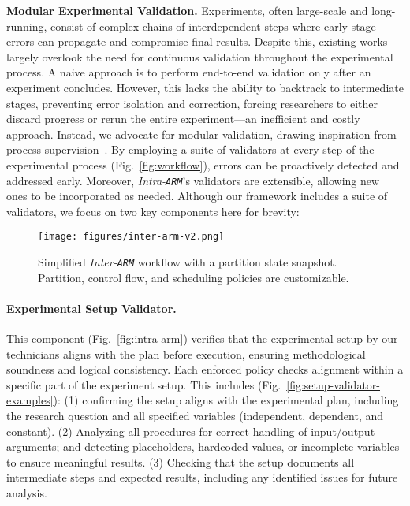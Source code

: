 \noindent\textbf{Modular Experimental Validation.} 
Experiments, often large-scale and long-running, consist of complex chains of interdependent steps where early-stage errors can propagate and compromise final results. Despite this, existing works~\cite{lu2024ai, schmidgall2025agent} largely overlook the need for continuous validation throughout the experimental process.
A naive approach is to perform end-to-end validation only after an experiment concludes. However, this lacks the ability to backtrack to intermediate stages, preventing error isolation and correction, forcing researchers to either discard progress or rerun the entire experiment—an inefficient and costly approach.
Instead, we advocate for modular validation, drawing inspiration from process supervision~\cite{lightman2023let}. By employing a suite of validators at every step of the experimental process (Fig.~\ref{fig:workflow}), errors can be proactively detected and addressed early.
Moreover, \textit{Intra-\texttt{ARM}}'s validators are extensible, allowing new ones to be incorporated as needed.
Although our framework includes a suite of validators, we focus on two key components here for brevity:
\fi



\begin{figure*}[t]
    \centering
    \texttt{[image: figures/inter-arm-v2.png]}
    \caption{Simplified \textit{Inter-\texttt{ARM}} workflow with a partition state snapshot. Partition, control flow, and scheduling policies are customizable.}
    \label{fig:inter-arm}
\end{figure*}

\paragraph{Experimental Setup Validator.}
This component (Fig.~\ref{fig:intra-arm}) 
verifies that the experimental setup by our technicians aligns with the plan before execution, ensuring methodological soundness and logical consistency.
Each enforced policy checks alignment within a specific part of the experiment setup. 
This includes (Fig.~\ref{fig:setup-validator-examples}): (1) confirming the setup aligns with the experimental plan, including the research question and all specified variables (independent, dependent, and constant). 
(2) Analyzing all procedures for correct handling of input/output arguments; and detecting placeholders, hardcoded values, or incomplete variables to ensure meaningful results. 
(3) Checking that the setup documents all intermediate steps and expected results, including any identified issues for future analysis.

